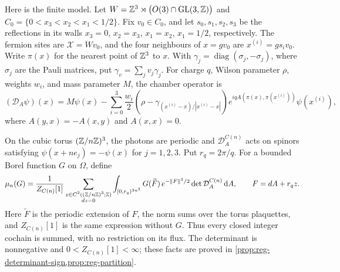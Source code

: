 Here is the finite model. Let
$W=\mathbb Z^3\rtimes\bigl(O(3)\cap\operatorname{GL}(3,\mathbb Z)\bigr)$ and
$C_0=\{0<x_3<x_2<x_1<1/2\}$. Fix $v_0\in C_0$, and let
$s_0,s_1,s_2,s_3$ be the reflections in its walls
$x_3=0$, $x_2=x_3$, $x_1=x_2$, $x_1=1/2$, respectively.
The fermion sites are $\mathcal X=Wv_0$, and the four neighbours
of $x=gv_0$ are $x^{(i)}=gs_iv_0$. Write $\pi(x)$ for the nearest
point of $\mathbb Z^3$ to $x$. With $\gamma_j=\operatorname{diag}(\sigma_j,-\sigma_j)$,
where $\sigma_j$ are the Pauli matrices, put $\gamma_v=\sum_jv_j\gamma_j$.
For charge $q$, Wilson parameter $\rho$, weights $w_i$, and mass
parameter $M$, the chamber operator is
\[
 (\mathcal D_A\psi)(x)
 =M\psi(x)-\sum_{i=0}^3\frac{w_i}{2}
   \left(\rho-\gamma_{(x^{(i)}-x)/|x^{(i)}-x|}\right)
   e^{iqA(\pi(x),\pi(x^{(i)}))}\psi(x^{(i)}),
\]
where $A(y,x)=-A(x,y)$ and $A(x,x)=0$.

On the cubic torus $(\mathbb Z/n\mathbb Z)^3$, the photons are periodic and
$\mathcal D_A^{C(n)}$ acts on spinors satisfying
$\psi(x+ne_j)=-\psi(x)$ for $j=1,2,3$. Put $r_q=2\pi/q$.
For a bounded Borel function $G$ on $\Omega$, define
\[
 \mu_n(G)=\frac1{Z_{C(n)}[1]}
 \sum_{\substack{z\in C^2((\mathbb Z/n\mathbb Z)^3;\mathbb Z)\\dz=0}}
 \int_{[0,r_q)^{3n^3}}
 G(\widetilde F)\,e^{-\|F\|^2/2}
       \det\mathcal D_A^{C(n)}\,\mathrm d A,
 \qquad F=dA+r_qz.
\]
Here $\widetilde F$ is the periodic extension of $F$, the norm sums
over the torus plaquettes, and $Z_{C(n)}[1]$ is the same expression
without $G$. Thus every closed integer cochain is summed, with no
restriction on its flux. The determinant is nonnegative and
$0<Z_{C(n)}[1]<\infty$; these facts are proved in
\cref{prop:reg-determinant-sign,prop:reg-partition}.

